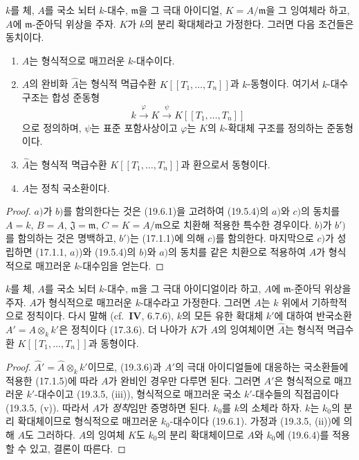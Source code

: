\begin{theorem}[19.6.4]
\label{0.19.6.4-ko}
$k$를 체, $A$를 국소 뇌터 $k$-대수, $\mathfrak m$을 그 극대
아이디얼, $K=A/\mathfrak m$을 그 잉여체라 하고, $A$에
$\mathfrak m$-준아딕 위상을 주자. $K$가 $k$의 분리 확대체라고
가정한다. 그러면 다음 조건들은 동치이다.
\begin{enumerate}
  \item[a)] $A$는 형식적으로 매끄러운 $k$-대수이다.
  \item[b)] $A$의 완비화 $\widehat A$는 형식적 멱급수환
  $K[[T_1,\ldots,T_n]]$과 $k$-동형이다. 여기서 $k$-대수 구조는 합성
  준동형
  \[
    k\xrightarrow{\varphi}K\xrightarrow{\psi}K[[T_1,\ldots,T_n]]
  \]
  으로 정의하며, $\psi$는 표준 포함사상이고 $\varphi$는 $K$의
  $k$-확대체 구조를 정의하는 준동형이다.
  \item[b')] $\widehat A$는 형식적 멱급수환
  $K[[T_1,\ldots,T_n]]$과 환으로서 동형이다.
  \item[c)] $A$는 정칙 국소환이다.
\end{enumerate}
\end{theorem}

\begin{proof}
$a)$가 $b)$를 함의한다는 것은 (19.6.1)을 고려하여 (19.5.4)의
$a)$와 $c)$의 동치를 $A=k$, $B=A$, $\mathfrak J=\mathfrak m$,
$C=K=A/\mathfrak m$으로 치환해 적용한 특수한 경우이다. $b)$가
$b')$를 함의하는 것은 명백하고, $b')$는 (17.1.1)에 의해 $c)$를
함의한다. 마지막으로 $c)$가 성립하면 (17.1.1, $a)$)와 (19.5.4)의
$b)$와 $a)$의 동치를 같은 치환으로 적용하여 $A$가 형식적으로
매끄러운 $k$-대수임을 얻는다.
\end{proof}

\begin{corollary}[19.6.5]
\label{0.19.6.5-ko}
$k$를 체, $A$를 국소 뇌터 $k$-대수, $\mathfrak m$을 그 극대
아이디얼이라 하고, $A$에 $\mathfrak m$-준아딕 위상을 주자. $A$가
형식적으로 매끄러운 $k$-대수라고 가정한다. 그러면 $A$는 $k$ 위에서
기하학적으로 정칙이다. 다시 말해 (cf.~$\mathbf{IV}$, 6.7.6), $k$의
모든 유한 확대체 $k'$에 대하여 반국소환 $A'=A\otimes_k k'$은
정칙이다 (17.3.6). 더 나아가 $K$가 $A$의 잉여체이면 $\widehat A$는
형식적 멱급수환 $K[[T_1,\ldots,T_n]]$과 동형이다.
\end{corollary}

\begin{proof}
$\widehat A'=\widehat A\otimes_k k'$이므로, (19.3.6)과 $A'$의 극대
아이디얼들에 대응하는 국소환들에 적용한 (17.1.5)에 따라 $A$가
완비인 경우만 다루면 된다. 그러면 $A'$은 형식적으로 매끄러운
$k'$-대수이고 (19.3.5, (iii)), 형식적으로 매끄러운 국소
$k'$-대수들의 직접곱이다 (19.3.5, (v)). 따라서 $A$가
\emph{정칙}임만 증명하면 된다. $k_0$를 $k$의 소체라 하자. $k$는
$k_0$의 분리 확대체이므로 형식적으로 매끄러운 $k_0$-대수이다
(19.6.1). 가정과 (19.3.5, (ii))에 의해 $A$도 그러하다. $A$의
잉여체 $K$도 $k_0$의 분리 확대체이므로 $A$와 $k_0$에 (19.6.4)를
적용할 수 있고, 결론이 따른다.
\end{proof}


